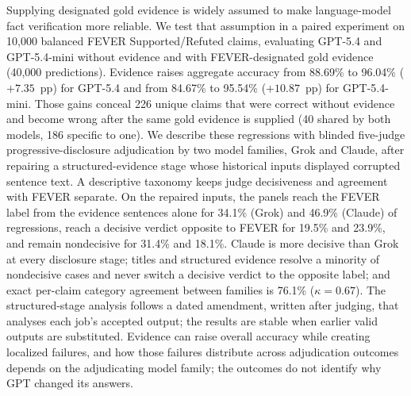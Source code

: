 Supplying designated gold evidence is widely assumed to make language-model fact verification more reliable.
We test that assumption in a paired experiment on 10{,}000 balanced FEVER Supported/Refuted claims, evaluating GPT-5.4 and GPT-5.4-mini without evidence and with FEVER-designated gold evidence (40{,}000 predictions).
Evidence raises aggregate accuracy from 88.69\% to 96.04\% ($+7.35$~pp) for GPT-5.4 and from 84.67\% to 95.54\% ($+10.87$~pp) for GPT-5.4-mini.
Those gains conceal 226 unique claims that were correct without evidence and become wrong after the same gold evidence is supplied (40 shared by both models, 186 specific to one).
We describe these regressions with blinded five-judge progressive-disclosure adjudication by two model families, Grok and Claude, after repairing a structured-evidence stage whose historical inputs displayed corrupted sentence text.
A descriptive taxonomy keeps judge decisiveness and agreement with FEVER separate.
On the repaired inputs, the panels reach the FEVER label from the evidence sentences alone for 34.1\% (Grok) and 46.9\% (Claude) of regressions, reach a decisive verdict opposite to FEVER for 19.5\% and 23.9\%, and remain nondecisive for 31.4\% and 18.1\%.
Claude is more decisive than Grok at every disclosure stage; titles and structured evidence resolve a minority of nondecisive cases and never switch a decisive verdict to the opposite label; and exact per-claim category agreement between families is 76.1\% ($\kappa=0.67$).
The structured-stage analysis follows a dated amendment, written after judging, that analyses each job's accepted output; the results are stable when earlier valid outputs are substituted.
Evidence can raise overall accuracy while creating localized failures, and how those failures distribute across adjudication outcomes depends on the adjudicating model family; the outcomes do not identify why GPT changed its answers.
